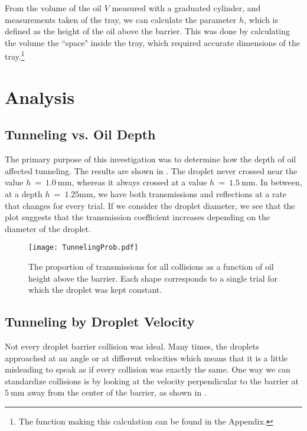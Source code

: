 From the volume of the oil $V$ measured with a graduated cylinder, and measurements taken of the tray, we can calculate the parameter $h$, which is defined as the height of the oil above the barrier. This was done by calculating the volume the ``space" inside the tray, which required accurate dimensions of the tray.\footnote{The function making this calculation can be found in the Appendix.}




\section{Analysis}


    \subsection{Tunneling vs. Oil Depth}
The primary purpose of this investigation was to determine how the depth of oil affected tunneling. The results are shown in . The droplet never crossed near the value $h~=~1.0~\mathrm{mm}$, whereas it always crossed at a value $h~=~1.5~\mathrm{mm}$. In between, at a depth $h~=~1.25\mathrm{mm}$, we have both transmissions and reflections at a rate that changes for every trial. If we consider the droplet diameter, we see that the plot suggests that the transmission coefficient increases depending on the diameter of the droplet.

\begin{figure}[h!]
	\centering
	\texttt{[image: TunnelingProb.pdf]}
	\caption{The proportion of transmissions for all collisions as a function of oil height above the barrier. Each shape corresponds to a single trial for which the droplet was kept constant.}
	\label{tbh}
\end{figure}

    \subsection{Tunneling by Droplet Velocity}
Not every droplet barrier collision was ideal. Many times, the droplets approached at an angle or at different velocities which means that it is a little misleading to speak as if every collision was exactly the same. One way we can standardize collisions is by looking at the velocity perpendicular to the barrier at $5~\mathrm{mm}$ away from the center of the barrier, as shown in .

